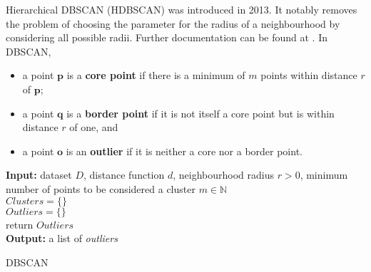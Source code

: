 Hierarchical DBSCAN (HDBSCAN) \cite{HDBSCAN} was introduced in 2013.
It notably removes the problem of choosing the parameter for the radius of a neighbourhood by considering all possible radii. 
Further documentation can be found at \cite{HDBSCAN_code}. \newl 
In DBSCAN, 
\begin{itemize}[noitemsep]
\item a point $\mathbf{p}$ is a \textbf{core point} if there is a minimum of $m$ points within distance $r$ of $\mathbf{p}$;
\item a point $\mathbf{q}$ is a \textbf{border point} if it is not itself a core point but is within distance $r$ of one, and 
\item a point $\mathbf{o}$ is an \textbf{outlier} if it is neither a core nor a border point.
\end{itemize}
\begin{algorithm}[h]
\SetAlgoLined
\textbf{Input:} dataset $D$,
distance function $d$,
neighbourhood radius $r>0$,
minimum number of points to be considered a cluster $m\in\mathbb{N}$
\\$\textit{Clusters} = \{\}$
\\$\textit{Outliers} = \{\}$
\\
return $\textit{Outliers}$
\\\textbf{Output:} a list of \textit{outliers}
\caption{DBSCAN}
\label{dbscan}
\end{algorithm}







